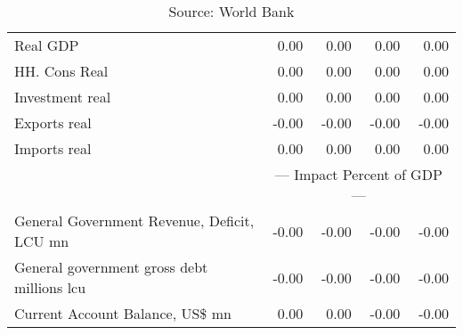 \documentclass{article}
\begin{document}
\begin{table}[ht]
\begin{tabular}{lrrrr}
Real GDP & 0.00 & 0.00 & 0.00 & 0.00 \\
HH. Cons Real & 0.00 & 0.00 & 0.00 & 0.00 \\
Investment real & 0.00 & 0.00 & 0.00 & 0.00 \\
Exports real & -0.00 & -0.00 & -0.00 & -0.00 \\
Imports real & 0.00 & 0.00 & 0.00 & 0.00 \\
&\multicolumn{4}{c}{{--- Impact Percent of GDP ---}}                     \\
General Government Revenue, Deficit, LCU mn & -0.00 & -0.00 & -0.00 & -0.00 \\
General government gross debt millions lcu & -0.00 & -0.00 & -0.00 & -0.00 \\
Current Account Balance, US\$ mn & 0.00 & 0.00 & -0.00 & -0.00 \\
\bottomrule
\end{tabular}
\caption*{Source: World Bank}
\end{table}
\end{document}
